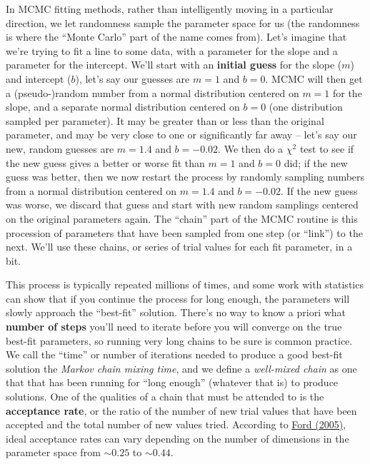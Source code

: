 \documentclass[a4paper]{article}
\begin{document}
In MCMC fitting methods, rather than intelligently moving in a particular direction, we let randomness sample the parameter space for us (the randomness is where the ``Monte Carlo'' part of the name comes from). Let's imagine that we're trying to fit a line to some data, with a parameter for the slope and a parameter for the intercept. We'll start with an \textbf{initial guess} for the slope ($m$) and intercept ($b$), let's say our guesses are $m=1$ and $b=0$. MCMC will then get a (pseudo-)random number from a normal distribution centered on $m=1$ for the slope, and a separate normal distribution centered on $b=0$ (one distribution sampled per parameter). It may be greater than or less than the original parameter, and may be very close to one or significantly far away -- let's say our new, random guesses are $m=1.4$ and $b = -0.02$. We then do a $\chi^2$ test to see if the new guess gives a better or worse fit than $m=1$ and $b=0$ did; if the new guess was better, then we now restart the process by randomly sampling numbers from a normal distribution centered on $m=1.4$ and $b = -0.02$. If the new guess was worse, we discard that guess and start with new random samplings centered on the original parameters again. The ``chain'' part of the MCMC routine is this procession of parameters that have been sampled from one step (or ``link'') to the next. We'll use these chains, or series of trial values for each fit parameter, in a bit. 

This process is typically repeated millions of times, and some work with statistics can show that if you continue the process for long enough, the parameters will slowly approach the ``best-fit'' solution. There's no way to know a priori what \textbf{number of steps} you'll need to iterate before you will converge on the true best-fit parameters, so running very long chains to be sure is common practice. We call the ``time'' or number of iterations needed to produce a good best-fit solution the \textit{Markov chain mixing time}, and we define a \textit{well-mixed chain} as one that that has been running for ``long enough'' (whatever that is) to produce solutions. One of the qualities of a chain that must be attended to is the \textbf{acceptance rate}, or the ratio of the number of new trial values that have been accepted and the total number of new values tried. According to \href{http://adsabs.harvard.edu/abs/2005AJ....129.1706F}{Ford (2005)}, ideal acceptance rates can vary depending on the number of dimensions in the parameter space from $\sim0.25$ to $\sim0.44$.
\end{document}
